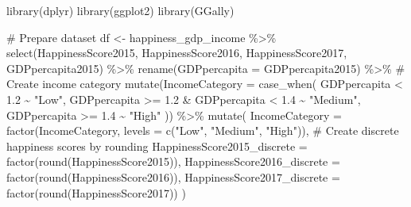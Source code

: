 \documentclass[
  letterpaper,
  DIV=11,
  numbers=noendperiod]{scrreprt}
\newenvironment{Shaded}{\begin{snugshade}}{\end{snugshade}}
\newcommand{\AttributeTok}[1]{\textcolor[rgb]{0.40,0.45,0.13}{#1}}
\newcommand{\CommentTok}[1]{\textcolor[rgb]{0.37,0.37,0.37}{#1}}
\newcommand{\FloatTok}[1]{\textcolor[rgb]{0.68,0.00,0.00}{#1}}
\newcommand{\FunctionTok}[1]{\textcolor[rgb]{0.28,0.35,0.67}{#1}}
\newcommand{\NormalTok}[1]{\textcolor[rgb]{0.00,0.23,0.31}{#1}}
\newcommand{\OtherTok}[1]{\textcolor[rgb]{0.00,0.23,0.31}{#1}}
\newcommand{\SpecialCharTok}[1]{\textcolor[rgb]{0.37,0.37,0.37}{#1}}
\newcommand{\StringTok}[1]{\textcolor[rgb]{0.13,0.47,0.30}{#1}}
\begin{document}
\begin{Shaded}
\begin{Highlighting}[]
\FunctionTok{library}\NormalTok{(dplyr)}
\FunctionTok{library}\NormalTok{(ggplot2)}
\FunctionTok{library}\NormalTok{(GGally)}

\CommentTok{\# Prepare dataset}
\NormalTok{df }\OtherTok{\textless{}{-}}\NormalTok{ happiness\_gdp\_income }\SpecialCharTok{\%\textgreater{}\%}
  \FunctionTok{select}\NormalTok{(HappinessScore2015, HappinessScore2016, HappinessScore2017,}
\NormalTok{         GDPpercapita2015) }\SpecialCharTok{\%\textgreater{}\%}
  \FunctionTok{rename}\NormalTok{(}\AttributeTok{GDPpercapita =}\NormalTok{ GDPpercapita2015) }\SpecialCharTok{\%\textgreater{}\%}
  \CommentTok{\# Create income category}
  \FunctionTok{mutate}\NormalTok{(}\AttributeTok{IncomeCategory =} \FunctionTok{case\_when}\NormalTok{(}
\NormalTok{    GDPpercapita }\SpecialCharTok{\textless{}} \FloatTok{1.2} \SpecialCharTok{\textasciitilde{}} \StringTok{"Low"}\NormalTok{,}
\NormalTok{    GDPpercapita }\SpecialCharTok{\textgreater{}=} \FloatTok{1.2} \SpecialCharTok{\&}\NormalTok{ GDPpercapita }\SpecialCharTok{\textless{}} \FloatTok{1.4} \SpecialCharTok{\textasciitilde{}} \StringTok{"Medium"}\NormalTok{,}
\NormalTok{    GDPpercapita }\SpecialCharTok{\textgreater{}=} \FloatTok{1.4} \SpecialCharTok{\textasciitilde{}} \StringTok{"High"}
\NormalTok{  )) }\SpecialCharTok{\%\textgreater{}\%}
  \FunctionTok{mutate}\NormalTok{(}
    \AttributeTok{IncomeCategory =} \FunctionTok{factor}\NormalTok{(IncomeCategory, }\AttributeTok{levels =} \FunctionTok{c}\NormalTok{(}\StringTok{"Low"}\NormalTok{, }\StringTok{"Medium"}\NormalTok{, }\StringTok{"High"}\NormalTok{)),}
    \CommentTok{\# Create discrete happiness scores by rounding}
    \AttributeTok{HappinessScore2015\_discrete =} \FunctionTok{factor}\NormalTok{(}\FunctionTok{round}\NormalTok{(HappinessScore2015)),}
    \AttributeTok{HappinessScore2016\_discrete =} \FunctionTok{factor}\NormalTok{(}\FunctionTok{round}\NormalTok{(HappinessScore2016)),}
    \AttributeTok{HappinessScore2017\_discrete =} \FunctionTok{factor}\NormalTok{(}\FunctionTok{round}\NormalTok{(HappinessScore2017))}
\NormalTok{  )}


\end{Highlighting}
\end{Shaded}
\end{document}
